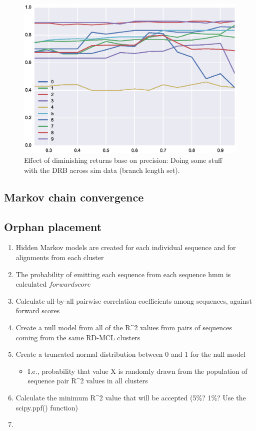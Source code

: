 \documentclass[twocolumn]{bmcart}%
\begin{document}
\begin{figure}[t]
  \begin{center}
  \includegraphics[height=0.22\textheight]{../figures/dim_ret_precision_line.eps}
\end{center}
\caption{Effect of diminishing returns base on precision: Doing some stuff with the DRB across sim data (branch length set).}
\label{fig:dim_rets}
\end{figure}


\subsection{Markov chain convergence}\label{subsec:markovChainConvergence}
\lipsum[3]


\subsection{Orphan placement}\label{subsec:orphanPlacement}
\begin{enumerate}
  \item Hidden Markov models are created for each individual sequence and for alignments from each cluster
  \item The probability of emitting each sequence from each sequence hmm is calculated \(forward score\)
  \item Calculate all-by-all pairwise correlation coefficients among sequences, against forward scores
  \item Create a null model from all of the R\textasciicircum2 values from pairs of sequences coming from the same RD-MCL clusters
  \item Create a truncated normal distribution between 0 and 1 for the null model
    \begin{itemize}
    \item I.e., probability that value X is randomly drawn from the population of sequence pair R\textasciicircum2 values in all clusters
    \end{itemize}
  \item Calculate the minimum R\textasciicircum2 value that will be accepted (5\%? 1\%? Use the scipy.ppf() function)
  \item
\end{enumerate}
\end{document}
